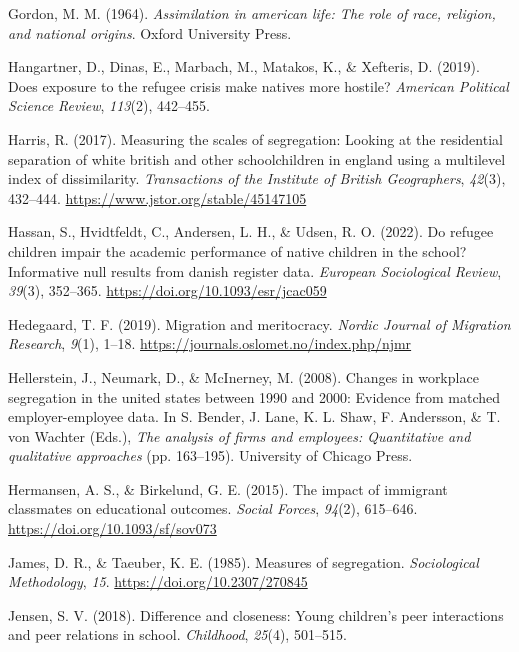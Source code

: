 \documentclass[
]{book}
\newlength{\cslhangindent}
\newenvironment{CSLReferences}[2] %
 {\begin{list}{}{%
  \setlength{\itemindent}{0pt}
  \setlength{\leftmargin}{0pt}
  \setlength{\parsep}{0pt}
  \ifodd #1
   \setlength{\leftmargin}{\cslhangindent}
   \setlength{\itemindent}{-1\cslhangindent}
  \fi
  \setlength{\itemsep}{#2\baselineskip}}}
 {\end{list}}
\begin{document}
\begin{CSLReferences}{1}{0}
Gordon, M. M. (1964). \emph{Assimilation in american life: The role of race, religion, and national origins}. Oxford University Press.

Hangartner, D., Dinas, E., Marbach, M., Matakos, K., \& Xefteris, D. (2019). Does exposure to the refugee crisis make natives more hostile? \emph{American Political Science Review}, \emph{113}(2), 442--455.

Harris, R. (2017). Measuring the scales of segregation: Looking at the residential separation of white british and other schoolchildren in england using a multilevel index of dissimilarity. \emph{Transactions of the Institute of British Geographers}, \emph{42}(3), 432--444. \url{https://www.jstor.org/stable/45147105}

Hassan, S., Hvidtfeldt, C., Andersen, L. H., \& Udsen, R. O. (2022). Do refugee children impair the academic performance of native children in the school? Informative null results from danish register data. \emph{European Sociological Review}, \emph{39}(3), 352--365. \url{https://doi.org/10.1093/esr/jcac059}

Hedegaard, T. F. (2019). Migration and meritocracy. \emph{Nordic Journal of Migration Research}, \emph{9}(1), 1--18. \url{https://journals.oslomet.no/index.php/njmr}

Hellerstein, J., Neumark, D., \& McInerney, M. (2008). Changes in workplace segregation in the united states between 1990 and 2000: Evidence from matched employer-employee data. In S. Bender, J. Lane, K. L. Shaw, F. Andersson, \& T. von Wachter (Eds.), \emph{The analysis of firms and employees: Quantitative and qualitative approaches} (pp. 163--195). University of Chicago Press.

Hermansen, A. S., \& Birkelund, G. E. (2015). The impact of immigrant classmates on educational outcomes. \emph{Social Forces}, \emph{94}(2), 615--646. \url{https://doi.org/10.1093/sf/sov073}

James, D. R., \& Taeuber, K. E. (1985). Measures of segregation. \emph{Sociological Methodology}, \emph{15}. \url{https://doi.org/10.2307/270845}

Jensen, S. V. (2018). Difference and closeness: Young children's peer interactions and peer relations in school. \emph{Childhood}, \emph{25}(4), 501--515.


\end{CSLReferences}
\end{document}
